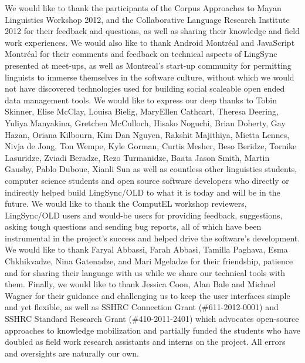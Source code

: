 \documentclass[11pt]{article}
\begin{document}
We would like to thank the participants of the Corpus Approaches to Mayan Linguistics Workshop 2012, and the  
Collaborative Language Research Institute 2012  for their feedback and questions, as well as sharing their knowledge and field work experiences. We would also like to thank 
Android Montr\'eal and JavaScript Montr\'eal for their comments and feedback on technical aspects of LingSync presented at meet-ups,
as well as Montreal's start-up community for permitting linguists to immerse themselves in the software culture, 
without which we would not have discovered technologies  used for building social scaleable open ended data management tools.
We would like to express our deep thanks to Tobin Skinner,
Elise McClay,
Louisa Bielig,
MaryEllen Cathcart,
Theresa Deering,
Yuliya Manyakina,
Gretchen McCulloch, 
Hisako Noguchi, 
Brian Doherty, 
Gay Hazan,
Oriana Kilbourn,
Kim Dan Nguyen,
Rakshit Majithiya,
Mietta Lennes,
Nivja de Jong,
Ton Wempe,
Kyle Gorman,
Curtis Mesher,
Beso Beridze, 
Tornike Lasuridze, 
Zviadi Beradze, 
Rezo Turmanidze,
Baata
Jason Smith,
Martin Gausby,
Pablo Duboue,
Xianli Sun as well as countless other linguistics students,  computer science students and open source software developers  who directly or indirectly helped build LingSync/OLD to what it is today and will be in the future. 
We would like to thank the ComputEL workshop reviewers, LingSync/OLD users and would-be users for providing feedback, suggestions,  asking tough questions and sending bug reports, all of which have been instrumental
 in the project's success and helped drive
 the software's development.
 We would like to thank Faryal Abbassi, Farah Abbasi, Tamilla Paghava, Esma Chkhikvadze, Nina Gatenadze, and Mari Mgeladze for their friendship, patience and for sharing their language with us while we share our  technical tools with them.
Finally, we would like to thank Jessica Coon, Alan Bale and Michael
Wagner for their guidance and challenging us to keep the user interfaces simple
and yet flexible, as well as SSHRC Connection Grant (\#611-2012-0001)
and SSHRC Standard Research Grant (\#410-2011-2401) which 
 advocates open-source approaches to knowledge mobilization and
partially funded the students who have doubled as field work research
assistants and interns on the project. All errors and oversights are
naturally our own.  

\printglossary




\end{document}
